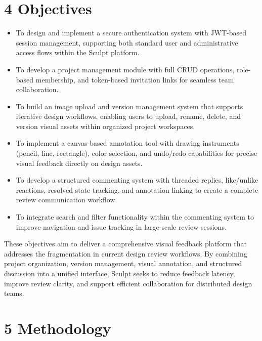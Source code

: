 \documentclass[12pt,a4paper]{article}
\begin{document}
\section{4 Objectives}

\begin{itemize}
    \item To design and implement a secure authentication system with JWT-based session management, supporting both standard user and administrative access flows within the Sculpt platform.

    \item To develop a project management module with full CRUD operations, role-based membership, and token-based invitation links for seamless team collaboration.

    \item To build an image upload and version management system that supports iterative design workflows, enabling users to upload, rename, delete, and version visual assets within organized project workspaces.

    \item To implement a canvas-based annotation tool with drawing instruments (pencil, line, rectangle), color selection, and undo/redo capabilities for precise visual feedback directly on design assets.

    \item To develop a structured commenting system with threaded replies, like/unlike reactions, resolved state tracking, and annotation linking to create a complete review communication workflow.

    \item To integrate search and filter functionality within the commenting system to improve navigation and issue tracking in large-scale review sessions.
\end{itemize}

These objectives aim to deliver a comprehensive visual feedback platform that addresses the fragmentation in current design review workflows. By combining project organization, version management, visual annotation, and structured discussion into a unified interface, Sculpt seeks to reduce feedback latency, improve review clarity, and support efficient collaboration for distributed design teams.

\section{5 Methodology}
\end{document}
